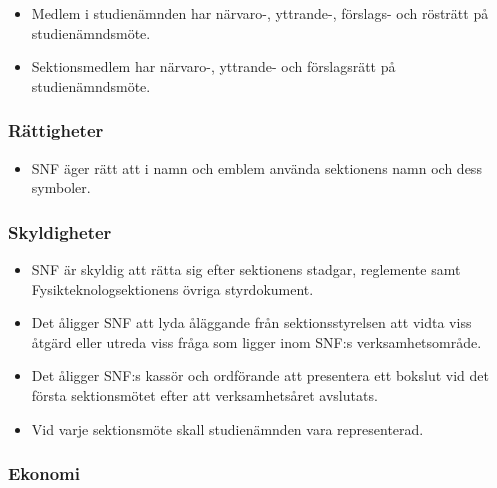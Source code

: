 \documentclass[11pt,a4paper]{article}
\begin{document}
\begin{itemize}

  \item Medlem i studienämnden har
  närvaro-, yttrande-, förslags- och rösträtt på studienämndsmöte. 
  
  \item Sektionsmedlem har närvaro-, yttr\-ande- och förslagsrätt på studienämndsmöte.

\end{itemize}

\subsubsection{Rättigheter}

\begin{itemize}

  \item SNF äger rätt att i namn och emblem använda sektionens namn
  och dess symboler.

\end{itemize}

\subsubsection{Skyldigheter}

\begin{itemize}

  \item SNF är skyldig att rätta sig efter sektionens stadgar,
  reglemente samt Fysikteknologsektionens övriga styrdokument.

  \item Det åligger SNF att lyda åläggande från sektionsstyrelsen att
  vidta viss åtgärd eller utreda viss fråga som ligger inom SNF:s
  verksamhetsområde.
  
  \item Det åligger SNF:s kassör och ordförande att presentera ett bokslut vid det första sektionsmötet efter att verksamhetsåret avslutats.
  
  \item Vid varje sektionsmöte skall studienämnden vara representerad.

\end{itemize}

\subsubsection{Ekonomi}
\end{document}
